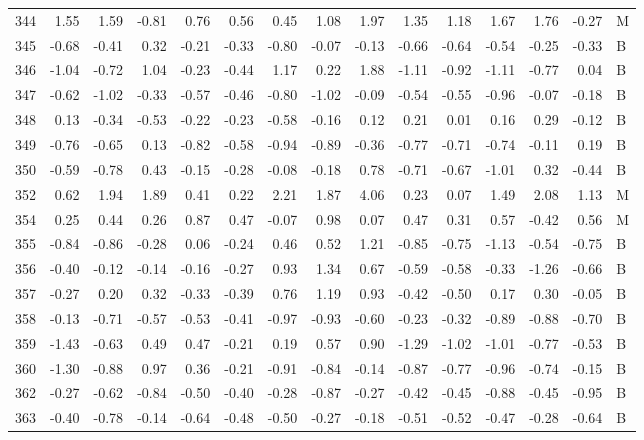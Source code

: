 \begin{table}[ht]
\begin{tabular}{rrrrrrrrrrrrrrl}
  344 & 1.55 & 1.59 & -0.81 & 0.76 & 0.56 & 0.45 & 1.08 & 1.97 & 1.35 & 1.18 & 1.67 & 1.76 & -0.27 & M \\ 
  345 & -0.68 & -0.41 & 0.32 & -0.21 & -0.33 & -0.80 & -0.07 & -0.13 & -0.66 & -0.64 & -0.54 & -0.25 & -0.33 & B \\ 
  346 & -1.04 & -0.72 & 1.04 & -0.23 & -0.44 & 1.17 & 0.22 & 1.88 & -1.11 & -0.92 & -1.11 & -0.77 & 0.04 & B \\ 
  347 & -0.62 & -1.02 & -0.33 & -0.57 & -0.46 & -0.80 & -1.02 & -0.09 & -0.54 & -0.55 & -0.96 & -0.07 & -0.18 & B \\ 
  348 & 0.13 & -0.34 & -0.53 & -0.22 & -0.23 & -0.58 & -0.16 & 0.12 & 0.21 & 0.01 & 0.16 & 0.29 & -0.12 & B \\ 
  349 & -0.76 & -0.65 & 0.13 & -0.82 & -0.58 & -0.94 & -0.89 & -0.36 & -0.77 & -0.71 & -0.74 & -0.11 & 0.19 & B \\ 
  350 & -0.59 & -0.78 & 0.43 & -0.15 & -0.28 & -0.08 & -0.18 & 0.78 & -0.71 & -0.67 & -1.01 & 0.32 & -0.44 & B \\ 
  352 & 0.62 & 1.94 & 1.89 & 0.41 & 0.22 & 2.21 & 1.87 & 4.06 & 0.23 & 0.07 & 1.49 & 2.08 & 1.13 & M \\ 
  354 & 0.25 & 0.44 & 0.26 & 0.87 & 0.47 & -0.07 & 0.98 & 0.07 & 0.47 & 0.31 & 0.57 & -0.42 & 0.56 & M \\ 
  355 & -0.84 & -0.86 & -0.28 & 0.06 & -0.24 & 0.46 & 0.52 & 1.21 & -0.85 & -0.75 & -1.13 & -0.54 & -0.75 & B \\ 
  356 & -0.40 & -0.12 & -0.14 & -0.16 & -0.27 & 0.93 & 1.34 & 0.67 & -0.59 & -0.58 & -0.33 & -1.26 & -0.66 & B \\ 
  357 & -0.27 & 0.20 & 0.32 & -0.33 & -0.39 & 0.76 & 1.19 & 0.93 & -0.42 & -0.50 & 0.17 & 0.30 & -0.05 & B \\ 
  358 & -0.13 & -0.71 & -0.57 & -0.53 & -0.41 & -0.97 & -0.93 & -0.60 & -0.23 & -0.32 & -0.89 & -0.88 & -0.70 & B \\ 
  359 & -1.43 & -0.63 & 0.49 & 0.47 & -0.21 & 0.19 & 0.57 & 0.90 & -1.29 & -1.02 & -1.01 & -0.77 & -0.53 & B \\ 
  360 & -1.30 & -0.88 & 0.97 & 0.36 & -0.21 & -0.91 & -0.84 & -0.14 & -0.87 & -0.77 & -0.96 & -0.74 & -0.15 & B \\ 
  362 & -0.27 & -0.62 & -0.84 & -0.50 & -0.40 & -0.28 & -0.87 & -0.27 & -0.42 & -0.45 & -0.88 & -0.45 & -0.95 & B \\ 
  363 & -0.40 & -0.78 & -0.14 & -0.64 & -0.48 & -0.50 & -0.27 & -0.18 & -0.51 & -0.52 & -0.47 & -0.28 & -0.64 & B \\ 

\end{tabular}
\end{table}
